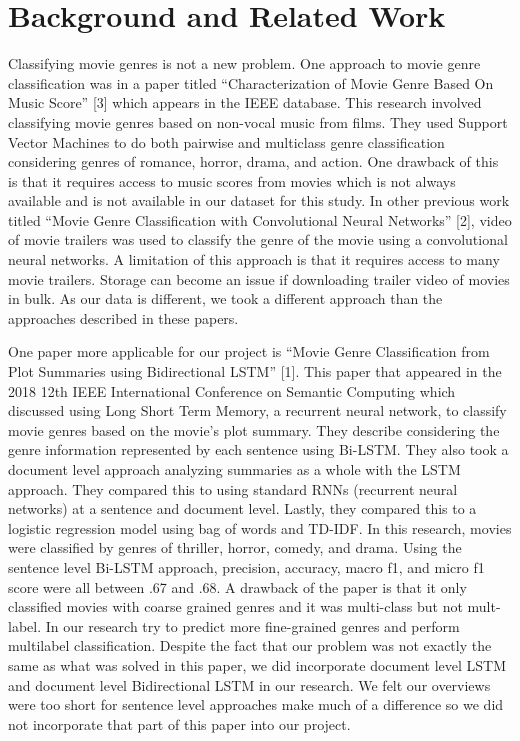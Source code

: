 \documentclass[sigconf]{acmart}
\begin{document}
\section{Background and Related Work}

Classifying movie genres is not a new problem. One approach to movie genre classification was in a paper titled ``Characterization of Movie Genre Based On Music Score'' [3] which appears in the IEEE database.  This research involved classifying movie genres based on non-vocal music from films.  They used Support Vector Machines to do both pairwise and multiclass genre classification considering genres of romance, horror, drama, and action.  One drawback of this is that it requires access to music scores from movies which is not always available and is not available in our dataset for this study.  In other previous work titled ``Movie Genre Classification with Convolutional Neural Networks'' [2], video of movie trailers was used to classify the genre of the movie using a convolutional neural networks. A limitation of this approach is that it requires access to many movie trailers.  Storage can become an issue if downloading trailer video of movies in bulk. As our data is different, we took a different approach than the approaches described in these papers. 

One paper more applicable for our project is ``Movie Genre Classification from Plot Summaries using Bidirectional LSTM'' [1]. This paper that appeared in the 2018 12th IEEE International Conference on Semantic Computing which discussed using Long Short Term Memory, a recurrent neural network, to classify movie genres based on the movie's plot summary.  They describe considering the genre information represented by each sentence using Bi-LSTM. They also took a document level approach analyzing summaries as a whole with the LSTM approach.  They compared this to using standard RNNs (recurrent neural networks) at a sentence and document level.  Lastly, they compared this to a logistic regression model using bag of words and TD-IDF. In this research, movies were classified by genres of thriller, horror, comedy, and drama. Using the sentence level Bi-LSTM approach, precision, accuracy, macro f1, and micro f1 score were all between .67 and .68. A drawback of the paper is that it only classified movies with coarse grained genres and it was multi-class but not mult-label.  In our research try to predict more fine-grained genres and perform multilabel classification. Despite the fact that our problem was not exactly the same as what was solved in this paper, we did incorporate document level LSTM and document level Bidirectional LSTM in our research. We felt our overviews were too short for sentence level approaches make much of a difference so we did not incorporate that part of this paper into our project. 
\end{document}

